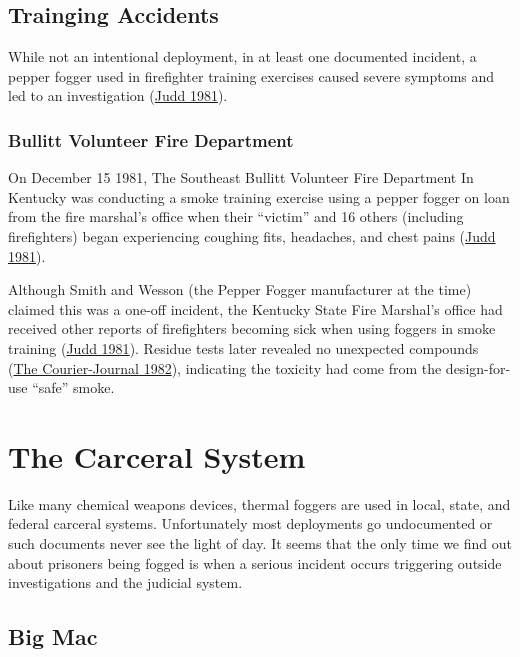 \documentclass[
  11pt,
]{krantz}
\begin{document}
\hypertarget{trainging-accidents}{%
\section{Trainging Accidents}\label{trainging-accidents}}

While not an intentional deployment, in at least one documented incident, a pepper fogger used in firefighter training exercises caused severe symptoms and led to an investigation (\protect\hyperlink{ref-Judd1981}{Judd 1981}).

\hypertarget{bullitt-volunteer-fire-department}{%
\subsection{Bullitt Volunteer Fire Department}\label{bullitt-volunteer-fire-department}}

On December 15 1981, The Southeast Bullitt Volunteer Fire Department In Kentucky was conducting a smoke training exercise using a pepper fogger on loan from the fire marshal's office when their ``victim'' and 16 others (including firefighters) began experiencing coughing fits, headaches, and chest pains (\protect\hyperlink{ref-Judd1981}{Judd 1981}).

Although Smith and Wesson (the Pepper Fogger manufacturer at the time) claimed this was a one-off incident, the Kentucky State Fire Marshal's office had received other reports of firefighters becoming sick when using foggers in smoke training (\protect\hyperlink{ref-Judd1981}{Judd 1981}).
Residue tests later revealed no unexpected compounds (\protect\hyperlink{ref-TheCourierJournal1982_01_10}{The Courier-Journal 1982}), indicating the toxicity had come from the design-for-use ``safe'' smoke.

\hypertarget{CarceralSystem}{%
\chapter{The Carceral System}\label{CarceralSystem}}

Like many chemical weapons devices, thermal foggers are used in local, state, and federal carceral systems.
Unfortunately most deployments go undocumented or such documents never see the light of day.
It seems that the only time we find out about prisoners being fogged is when a serious incident occurs triggering outside investigations and the judicial system.

\hypertarget{BigMac}{%
\section{Big Mac}\label{BigMac}}
\end{document}
